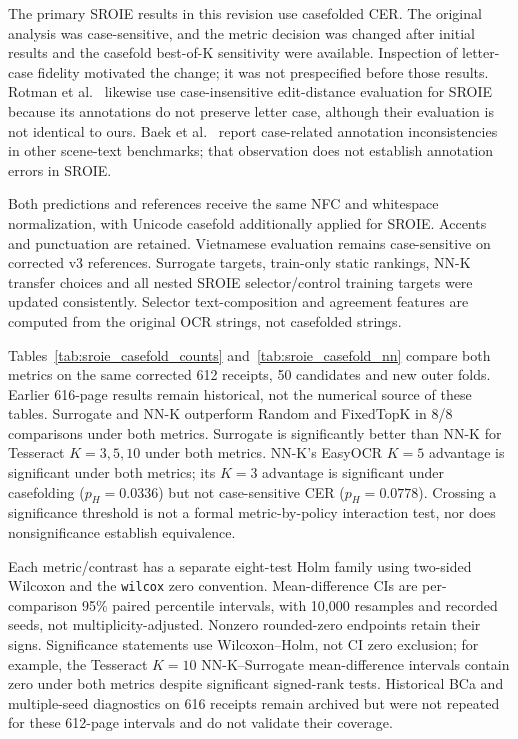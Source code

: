 \documentclass{article}
\begin{document}
The primary SROIE results in this revision use casefolded CER. The original analysis was case-sensitive, and the metric decision was changed after initial results and the casefold best-of-K sensitivity were available. Inspection of letter-case fidelity motivated the change; it was not prespecified before those results. Rotman et al.\ \cite{rotman2022masking} likewise use case-insensitive edit-distance evaluation for SROIE because its annotations do not preserve letter case, although their evaluation is not identical to ours. Baek et al.\ \cite{baek2019wrong} report case-related annotation inconsistencies in other scene-text benchmarks; that observation does not establish annotation errors in SROIE.

Both predictions and references receive the same NFC and whitespace normalization, with Unicode casefold additionally applied for SROIE. Accents and punctuation are retained. Vietnamese evaluation remains case-sensitive on corrected v3 references. Surrogate targets, train-only static rankings, NN-K transfer choices and all nested SROIE selector/control training targets were updated consistently. Selector text-composition and agreement features are computed from the original OCR strings, not casefolded strings.

Tables~\ref{tab:sroie_casefold_counts} and~\ref{tab:sroie_casefold_nn} compare both metrics on the same corrected 612 receipts, 50 candidates and new outer folds. Earlier 616-page results remain historical, not the numerical source of these tables. Surrogate and NN-K outperform Random and FixedTopK in 8/8 comparisons under both metrics. Surrogate is significantly better than NN-K for Tesseract $K=3,5,10$ under both metrics. NN-K's EasyOCR $K=5$ advantage is significant under both metrics; its $K=3$ advantage is significant under casefolding ($p_H=0.0336$) but not case-sensitive CER ($p_H=0.0778$). Crossing a significance threshold is not a formal metric-by-policy interaction test, nor does nonsignificance establish equivalence.

Each metric/contrast has a separate eight-test Holm family using two-sided Wilcoxon and the \texttt{wilcox} zero convention. Mean-difference CIs are per-comparison 95\% paired percentile intervals, with 10,000 resamples and recorded seeds, not multiplicity-adjusted. Nonzero rounded-zero endpoints retain their signs. Significance statements use Wilcoxon--Holm, not CI zero exclusion; for example, the Tesseract $K=10$ NN-K--Surrogate mean-difference intervals contain zero under both metrics despite significant signed-rank tests. Historical BCa and multiple-seed diagnostics on 616 receipts remain archived but were not repeated for these 612-page intervals and do not validate their coverage.
\end{document}
